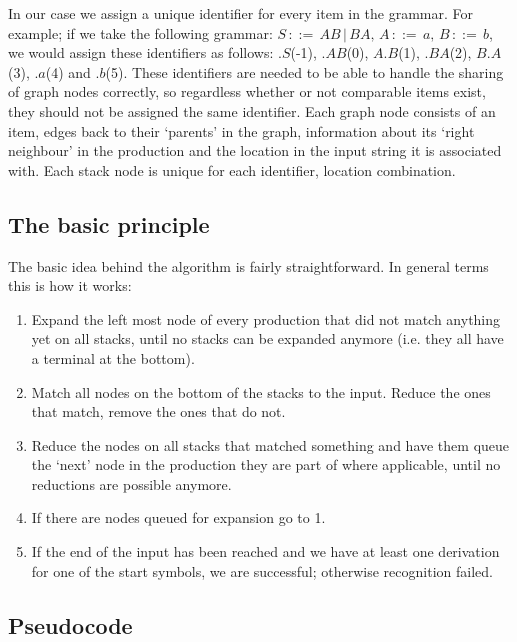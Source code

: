 \documentclass[a4paper,10pt]{article}
\begin{document}
In our case we assign a unique identifier for every item in the grammar. For example; if we take the following grammar: $S\,::=\,AB\,|\,BA,\,A\,::=\,a,\,B\,::=\,b$, we would assign these identifiers as follows: $.S$(-1), $.AB$(0), $A.B$(1), $.BA$(2), $B.A$(3), $.a$(4) and $.b$(5). These identifiers are needed to be able to handle the sharing of graph nodes correctly, so regardless whether or not comparable items exist, they should not be assigned the same identifier. Each graph node consists of an item, edges back to their `parents' in the graph, information about its `right neighbour' in the production and the location in the input string it is associated with. Each stack node is unique for each identifier, location combination.

\subsection{The basic principle}

The basic idea behind the algorithm is fairly straightforward. In general terms this is how it works:

\begin{enumerate}
 \setlength{\itemsep}{0pt}
 \setlength{\parskip}{0pt}
 \setlength{\parsep}{0pt}

 \item Expand the left most node of every production that did not match anything yet on all stacks, until no stacks can be expanded anymore (i.e. they all have a terminal at the bottom).
 \item Match all nodes on the bottom of the stacks to the input. Reduce the ones that match, remove the ones that do not.
 \item Reduce the nodes on all stacks that matched something and have them queue the `next' node in the production they are part of where applicable, until no reductions are possible anymore.
 \item If there are nodes queued for expansion go to 1.
 \item If the end of the input has been reached and we have at least one derivation for one of the start symbols, we are successful; otherwise recognition failed.
\end{enumerate}

\pagebreak
\subsection{Pseudocode}
\end{document}
